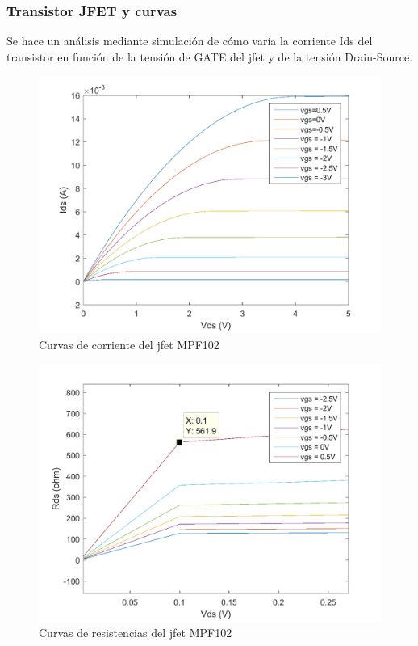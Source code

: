 \documentclass[../../tc_tp6_main.tex]{subfiles}
\begin{document}
\subsubsection{Transistor JFET y curvas}
\label{curvas_trans}
Se hace un análisis mediante simulación de cómo varía la corriente Ids del transistor en función de la tensión de GATE del jfet y de la tensión Drain-Source. 

\begin{figure}[H]	
	\centering
	\includegraphics[scale=0.5]{imagenes/corrientes_jfet.png}
	\caption{Curvas de corriente del jfet MPF102}
	\label{fig:ej1_corrientes_jfet}
\end{figure}

\begin{figure}[H]	
	\centering
	\includegraphics[scale=0.5]{imagenes/resistencias_jfet.png}
	\caption{Curvas de resistencias del jfet MPF102}
	\label{fig:ej1_resistencias_jfet}
\end{figure}
\end{document}
